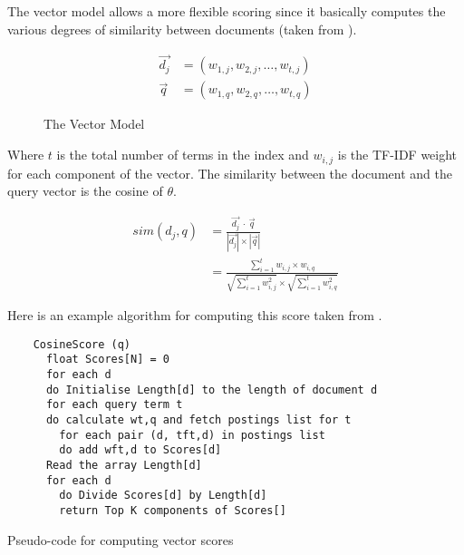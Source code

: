 The vector model allows a more flexible scoring since it basically computes the various degrees of similarity between documents (taken from \autocite[p.78]{Baeza-Yates2011}).

\begin{equation}
  \begin{split}
  \vec{d_j} &= (w_{1,j}, w_{2,j}, \ldots, w_{t,j})\\
  \vec{q} &= (w_{1,q}, w_{2,q}, \ldots, w_{t,q})
  \end{split}
  \label{eq:vector}
\end{equation}

\begin{figure}[!htbp] %
  \centering
\caption[Vector Model]{The Vector Model}
\label{fig:VM}
\end{figure}

Where $t$ is the total number of terms in the index and $w_{i,j}$ is the TF-IDF weight for each component of the vector. The similarity between the document and the query vector is the cosine of $\theta$.

\begin{equation}
  \begin{split}
  sim(d_j,q) &= \frac{\vec{d_j} \ \cdot \ \vec{q}}{|\vec{d_j}| \times |\vec{q}|}\\
  &= \frac{\sum_{i=1}^{t}w_{i,j} \times w_{i,q}}
  {\sqrt{\sum_{i=1}^{t}w_{i,j}^{2}} \times \sqrt{\sum_{i=1}^{t}w_{i,q}^{2}}}
  \end{split}
  \label{eq:sim2}
\end{equation}

Here is an example algorithm for computing this score taken from \autocite[p.125]{Manning2009}.

\begin{listing}[htb]
  \begin{verbatim}
    CosineScore (q)
      float Scores[N] = 0
      for each d
      do Initialise Length[d] to the length of document d
      for each query term t
      do calculate wt,q and fetch postings list for t
        for each pair (d, tft,d) in postings list
        do add wft,d to Scores[d]
      Read the array Length[d]
      for each d
      	do Divide Scores[d] by Length[d]
      	return Top K components of Scores[]
  \end{verbatim}
\caption[Pseudo-code for computing vector scores]{Pseudo-code for computing vector scores}
\label{code:VectorScores}
\end{listing}

